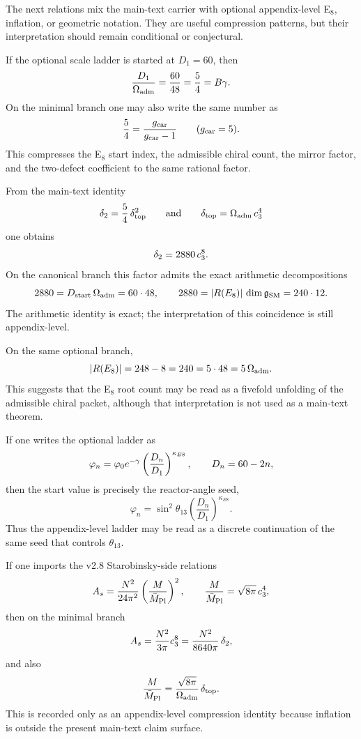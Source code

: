 The next relations mix the main-text carrier with optional appendix-level E$_8$, inflation, or geometric notation. They are useful compression patterns, but their interpretation should remain conditional or conjectural.

\begin{remark}
If the optional scale ladder is started at $D_1=60$, then
\[
\frac{D_1}{\Omega_{\mathrm{adm}}}=\frac{60}{48}=\frac54=B\gamma.
\]
On the minimal branch one may also write the same number as
\[
\frac54=\frac{g_{\mathrm{car}}}{g_{\mathrm{car}}-1}\qquad (g_{\mathrm{car}}=5).
\]
This compresses the E$_8$ start index, the admissible chiral count, the mirror factor, and the two-defect coefficient to the same rational factor.
\end{remark}

\begin{remark}
From the main-text identity
\[
\delta_2=\frac54\,\delta_{\mathrm{top}}^2
\qquad\text{and}\qquad
\delta_{\mathrm{top}}=\Omega_{\mathrm{adm}}\,c_3^4
\]
one obtains
\[
\delta_2=2880\,c_3^8.
\]
On the canonical branch this factor admits the exact arithmetic decompositions
\[
2880=D_{\mathrm{start}}\,\Omega_{\mathrm{adm}}=60\cdot48,
\qquad
2880=|R(E_8)|\,\dim\mathfrak g_{\mathrm{SM}}=240\cdot12.
\]
The arithmetic identity is exact; the interpretation of this coincidence is still appendix-level.
\end{remark}

\begin{conjecture}
On the same optional branch,
\[
|R(E_8)|=248-8=240=5\cdot48=5\,\Omega_{\mathrm{adm}}.
\]
This suggests that the E$_8$ root count may be read as a fivefold unfolding of the admissible chiral packet, although that interpretation is not used as a main-text theorem.
\end{conjecture}

\begin{remark}
If one writes the optional ladder as
\[
\varphi_n=\varphi_0 e^{-\gamma}\left(\frac{D_n}{D_1}\right)^{\kappa_{E8}},
\qquad
D_n=60-2n,
\]
then the start value is precisely the reactor-angle seed,
\[
\varphi_n=\sin^2\theta_{13}\left(\frac{D_n}{D_1}\right)^{\kappa_{E8}}.
\]
Thus the appendix-level ladder may be read as a discrete continuation of the same seed that controls $\theta_{13}$.
\end{remark}

\begin{remark}
If one imports the v2.8 Starobinsky-side relations
\[
A_s=\frac{N^2}{24\pi^2}\left(\frac{M}{\bar M_{\mathrm{Pl}}}\right)^2,
\qquad
\frac{M}{\bar M_{\mathrm{Pl}}}=\sqrt{8\pi}\,c_3^4,
\]
then on the minimal branch
\[
A_s=\frac{N^2}{3\pi}c_3^8=\frac{N^2}{8640\pi}\,\delta_2,
\]
and also
\[
\frac{M}{\bar M_{\mathrm{Pl}}}=\frac{\sqrt{8\pi}}{\Omega_{\mathrm{adm}}}\,\delta_{\mathrm{top}}.
\]
This is recorded only as an appendix-level compression identity because inflation is outside the present main-text claim surface.
\end{remark}

